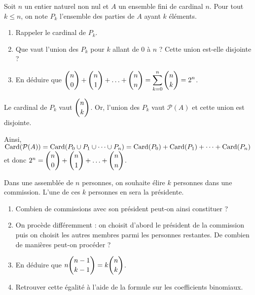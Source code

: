 \documentclass[11pt,fleqn, openany]{book} %
\begin{document}
\begin{exercise}
Soit $n$ un entier naturel non nul et $A$ un ensemble fini de cardinal $n$. Pour tout $k\leqslant n$, on note $P_k$ l'ensemble des parties de $A$ ayant $k$ éléments.
\begin{enumerate}
\item Rappeler le cardinal de $P_k$.
\item Que vaut l'union des $P_k$ pour $k$ allant de 0 à $n$ ? Cette union est-elle disjointe ?
\item En déduire que $\dbinom{n}{0} + \dbinom{n}{1} + \ldots + \dbinom{n}{n} =\displaystyle\sum_{k=0}^{n} \dbinom{n}{k} = 2^n$.
\end{enumerate}\end{exercise}

\begin{solution}Le cardinal de $P_k$ vaut $\dbinom{n}{k}$. Or, l'union des $P_k$ vaut $\mathcal{P}(A)$ et cette union est disjointe.

Ainsi, $\mathrm{Card}(\mathcal{P}(A))=\mathrm{Card}(P_0 \cup P_1 \cup \dots \cup P_n)=\mathrm{Card}(P_0)+\mathrm{Card}(P_1) + \dots + \mathrm{Card}(P_n)$ et donc $2^n = \dbinom{n}{0} + \dbinom{n}{1} + \ldots + \dbinom{n}{n}$.\end{solution}




\begin{exercise}Dans une assemblée de $n$ personnes, on souhaite élire $k$ personnes dans une commission. L'une de ces $k$ personnes en sera la présidente.
\begin{enumerate}
\item Combien de commissions avec son président peut-on ainsi constituer ?
\item On procède différemment : on choisit d'abord le président de la commission puis on choisit les autres membres parmi les personnes restantes. De combien de manières peut-on procéder ?
\item En déduire que $n \dbinom{n-1}{k-1} = k \dbinom{n}{k}$.
\item Retrouver cette égalité à l'aide de la formule sur les coefficients binomiaux.\end{enumerate} \end{exercise}
\end{document}
